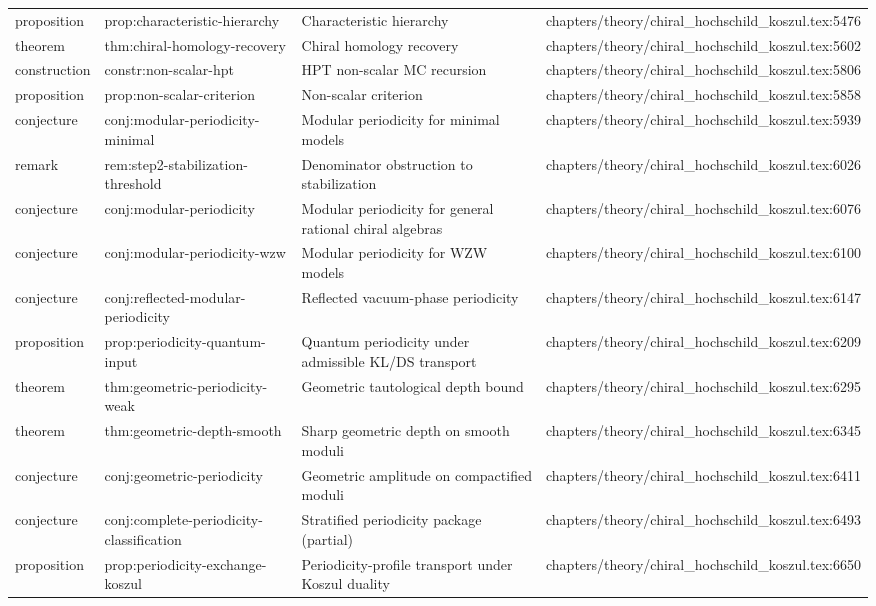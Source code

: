 \documentclass[11pt]{article}
\begin{document}
\begin{longtable}{L{0.10\textwidth}L{0.26\textwidth}L{0.42\textwidth}L{0.22\textwidth}}
proposition & prop:characteristic-hierarchy & Characteristic hierarchy & chapters/theory/chiral\_hochschild\_koszul.tex:5476\\
theorem & thm:chiral-homology-recovery & Chiral homology recovery & chapters/theory/chiral\_hochschild\_koszul.tex:5602\\
construction & constr:non-scalar-hpt & HPT non-scalar MC recursion & chapters/theory/chiral\_hochschild\_koszul.tex:5806\\
proposition & prop:non-scalar-criterion & Non-scalar criterion & chapters/theory/chiral\_hochschild\_koszul.tex:5858\\
conjecture & conj:modular-periodicity-minimal & Modular periodicity for minimal models & chapters/theory/chiral\_hochschild\_koszul.tex:5939\\
remark & rem:step2-stabilization-threshold & Denominator obstruction to stabilization & chapters/theory/chiral\_hochschild\_koszul.tex:6026\\
conjecture & conj:modular-periodicity & Modular periodicity for general rational chiral algebras & chapters/theory/chiral\_hochschild\_koszul.tex:6076\\
conjecture & conj:modular-periodicity-wzw & Modular periodicity for WZW models & chapters/theory/chiral\_hochschild\_koszul.tex:6100\\
conjecture & conj:reflected-modular-periodicity & Reflected vacuum-phase periodicity & chapters/theory/chiral\_hochschild\_koszul.tex:6147\\
proposition & prop:periodicity-quantum-input & Quantum periodicity under admissible KL/DS transport & chapters/theory/chiral\_hochschild\_koszul.tex:6209\\
theorem & thm:geometric-periodicity-weak & Geometric tautological depth bound & chapters/theory/chiral\_hochschild\_koszul.tex:6295\\
theorem & thm:geometric-depth-smooth & Sharp geometric depth on smooth moduli & chapters/theory/chiral\_hochschild\_koszul.tex:6345\\
conjecture & conj:geometric-periodicity & Geometric amplitude on compactified moduli & chapters/theory/chiral\_hochschild\_koszul.tex:6411\\
conjecture & conj:complete-periodicity-classification & Stratified periodicity package (partial) & chapters/theory/chiral\_hochschild\_koszul.tex:6493\\
proposition & prop:periodicity-exchange-koszul & Periodicity-profile transport under Koszul duality & chapters/theory/chiral\_hochschild\_koszul.tex:6650\\

\end{longtable}
\end{document}
